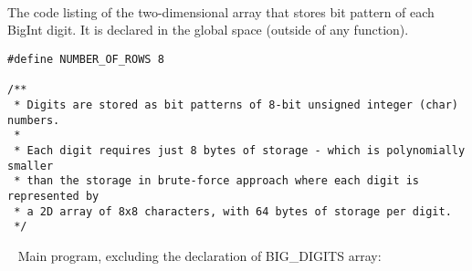 \documentclass{article}
\begin{document}
\paragraph{}\
\paragraph{}\
\paragraph{}\
\paragraph{}\
\paragraph{}\
\paragraph{}\
\paragraph{}\
\paragraph{}\
\paragraph{}\
\paragraph{}\

	
	\noindent The code listing of the two-dimensional array that stores bit pattern of each BigInt digit. It is declared in the global space (outside of any function).
	
	\begin{verbatim}
#define NUMBER_OF_ROWS 8

/**
 * Digits are stored as bit patterns of 8-bit unsigned integer (char) numbers.
 *
 * Each digit requires just 8 bytes of storage - which is polynomially smaller
 * than the storage in brute-force approach where each digit is represented by
 * a 2D array of 8x8 characters, with 64 bytes of storage per digit.
 */
	\end{verbatim}
	
	\rmfamily\
	\newline
	\noindent Main program, excluding the declaration of BIG_DIGITS array:
	
\end{document}
